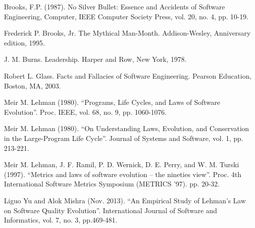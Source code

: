 % 
% 

\begin{thebibliography}{99.}%

 Brooks, F.P. (1987). No Silver Bullet: Essence and Accidents of Software Engineering, Computer, IEEE Computer Society Press, vol. 20, no. 4, pp. 10-19.

 Frederick P. Brooks, Jr. The Mythical Man-Month. Addison-Wesley, Anniversary edition, 1995.

 J. M. Burns. Leadership. Harper and Row, New York, 1978.

 Robert L. Glass. Facts and Fallacies of Software Engineering. Pearson Education, Boston, MA, 2003.

 Meir M. Lehman (1980). ``Programs, Life Cycles, and Laws of Software Evolution''. Proc. IEEE, vol. 68, no. 9, pp. 1060-1076.

 Meir M. Lehman (1980). ``On Understanding Laws, Evolution, and Conservation in the Large-Program Life Cycle''. Journal of Systems and Software, vol. 1, pp. 213-221.

 Meir M. Lehman, J. F. Ramil, P. D. Wernick, D. E. Perry, and W. M. Turski (1997). ``Metrics and laws of software evolution -- the nineties view''. Proc. 4th International Software Metrics Symposium (METRICS '97). pp. 20-32.

 Liguo Yu and Alok Mishra (Nov. 2013). ``An Empirical Study of Lehman's Law on Software Quality Evolution''. International Journal of Software and Informatics, vol. 7, no. 3, pp.469-481.


\end{thebibliography}
